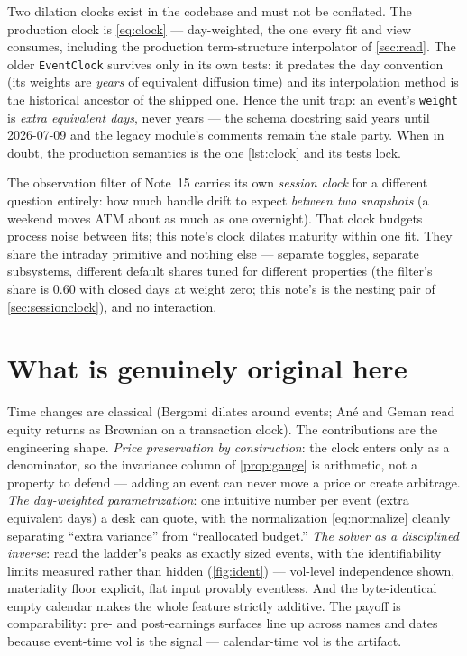 \documentclass[11pt]{article}
\begin{document}
\begin{remark}
\label{rem:twoclocks}
Two dilation clocks exist in the codebase and must not be conflated.
The production clock is \eqref{eq:clock} --- day-weighted, the one
every fit and view consumes, including the production term-structure
interpolator of \cref{sec:read}.  The older \texttt{EventClock}
survives only in its own tests: it predates the day convention (its
weights are \emph{years} of equivalent diffusion time) and its
interpolation method is the historical ancestor of the shipped one.
Hence the unit trap: an event's \texttt{weight} is \emph{extra
equivalent days}, never years --- the schema docstring said years until
2026-07-09 and the legacy module's comments remain the stale party.
When in doubt, the production semantics is the one \cref{lst:clock}
and its tests lock.
\end{remark}

\begin{remark}
\label{rem:intraday}
The observation filter of Note~15 carries its own \emph{session clock}
for a different question entirely: how much handle drift to expect
\emph{between two snapshots} (a weekend moves ATM about as much as one
overnight).  That clock budgets process noise between fits; this note's
clock dilates maturity within one fit.  They share the intraday
primitive and nothing else --- separate toggles, separate subsystems,
different default shares tuned for different properties (the filter's
share is $0.60$ with closed days at weight zero; this note's is the
nesting pair of \cref{sec:sessionclock}), and no interaction.
\end{remark}

\section{What is genuinely original here}
\label{sec:original}

Time changes are classical (Bergomi dilates around events; An\'e and
Geman read equity returns as Brownian on a transaction clock).  The
contributions are the engineering shape.  \emph{Price preservation by
construction}: the clock enters only as a denominator, so the invariance
column of \cref{prop:gauge} is arithmetic, not a property to defend ---
adding an event can never move a price or create arbitrage.  \emph{The
day-weighted parametrization}: one intuitive number per event (extra
equivalent days) a desk can quote, with the normalization
\eqref{eq:normalize} cleanly separating ``extra variance'' from
``reallocated budget.''  \emph{The solver as a disciplined inverse}:
read the ladder's peaks as exactly sized events, with the
identifiability limits measured rather than hidden
(\cref{fig:ident}) --- vol-level independence shown, materiality floor
explicit, flat input provably eventless.  And the byte-identical empty
calendar makes the whole feature strictly additive.  The payoff is
comparability: pre- and post-earnings surfaces line up across names and
dates because event-time vol is the signal --- calendar-time vol is the
artifact.
\end{document}
